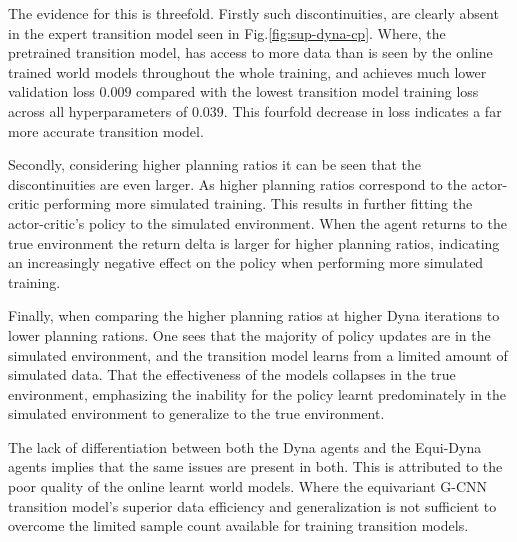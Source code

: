 The evidence for this is threefold. Firstly such discontinuities, are clearly absent in the expert transition model seen in Fig.\ref{fig:sup-dyna-cp}. Where, the pretrained transition model, has access to more data than is seen by the online trained world models throughout the whole training, and achieves much lower validation loss $0.009$ compared with the lowest transition model training loss across all hyperparameters of $0.039$. This fourfold decrease in loss indicates a far more accurate transition model.

Secondly, considering higher planning ratios it can be seen that the discontinuities are even larger. As higher planning ratios correspond to the actor-critic performing more simulated training. This results in further fitting the actor-critic's policy to the simulated environment. When the agent returns to the true environment the return delta is larger for higher planning ratios, indicating an increasingly negative effect on the policy when performing more simulated training.

Finally, when comparing the higher planning ratios at higher Dyna iterations to lower planning rations. One sees that the majority of policy updates are in the simulated environment, and the transition model learns from a limited amount of simulated data. That the effectiveness of the models collapses in the true environment, emphasizing the inability for the policy learnt predominately in the simulated environment to generalize to the true environment.



The lack of differentiation between both the Dyna agents and the Equi-Dyna agents implies that the same issues are present in both. This is attributed to the poor quality of the online learnt world models. Where the equivariant G-CNN transition model's superior data efficiency and generalization is not sufficient to overcome the limited sample count available for training transition models.

